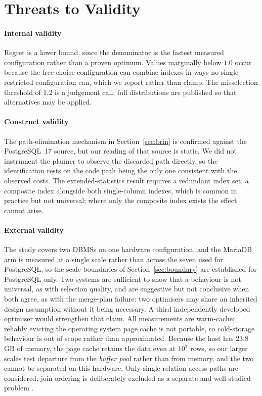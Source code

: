 \documentclass[preprint,12pt,authoryear]{elsarticle}
\begin{document}
\section{Threats to Validity}
\label{sec:threats}

\paragraph{Internal validity}
Regret is a lower bound, since the denominator is the fastest measured
configuration rather than a proven optimum. Values marginally below
$1.0$ occur because the free-choice configuration can combine indexes
in ways no single restricted configuration can, which we report rather
than clamp. The misselection threshold of $1.2$ is a judgement call;
full distributions are published so that alternatives may be applied.

\paragraph{Construct validity}
The path-elimination mechanism in Section~\ref{sec:brin} is confirmed
against the PostgreSQL~17 source, but our reading of that source is
static. We did not instrument the planner to observe the discarded path
directly, so the identification rests on the code path being the only
one consistent with the observed costs. The extended-statistics result
requires a redundant index set, a
composite index alongside both single-column indexes, which is common
in practice but not universal; where only the composite index exists
the effect cannot arise.

\paragraph{External validity}
The study covers two DBMSs on one hardware configuration, and the
MariaDB arm is measured at a single scale rather than across the seven
used for PostgreSQL, so the scale boundaries of
Section~\ref{sec:boundary} are established for PostgreSQL only. Two
systems are sufficient to show that a behaviour is not universal, as
with selection quality, and are suggestive but not conclusive when both
agree, as with the merge-plan failure: two optimisers may share an
inherited design assumption without it being necessary. A third
independently developed optimiser would strengthen that claim.
All measurements are warm-cache;
reliably evicting the operating system page cache is not portable, so
cold-storage behaviour is out of scope rather than approximated.
Because the host has 23.8\,GB of memory, the page cache retains the
data even at $10^7$ rows, so our larger scales test departure from the
\emph{buffer pool} rather than from memory, and the two cannot be
separated on this hardware. Only single-relation access paths are
considered; join ordering is deliberately excluded as a separate and
well-studied problem \citep{leis2018query}.
\end{document}

